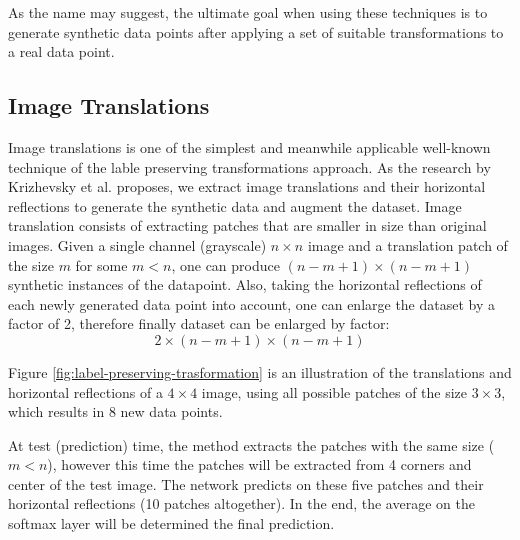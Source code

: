As the name may suggest, the ultimate goal when using these techniques is to generate synthetic data points after applying a set of suitable transformations to a real data point.

\subsection{Image Translations}
Image translations is one of the simplest and meanwhile applicable well-known technique of the lable
preserving transformations approach. As the research by Krizhevsky et al.
\cite{image_translation_paper} proposes, we extract
image translations and their horizontal reflections to generate the synthetic data and augment the
dataset. Image translation consists of extracting patches that are smaller in size than original
images. Given a single channel (grayscale) $n \times n$ image and a translation patch of the size
$m$ for some $m<n$, one can produce $(n-m+1) \times (n-m+1) $ synthetic instances of the datapoint. Also, taking
the horizontal reflections of each newly generated data point into account, one can enlarge the
dataset by a factor of 2, therefore finally dataset can be enlarged by factor: $$2\times(n-m+1)\times(n-m+1)$$ 

Figure \ref{fig:label-preserving-trasformation} is an illustration of the translations and horizontal
reflections of a $4 \times 4$ image, using all
possible patches of the size $3 \times 3$, which results in $8$ new data points.

At test (prediction) time, the method extracts the patches with the same size ($m < n$), however this time the
patches will be extracted from 4 corners and center of the test image. The network predicts on these
five patches and their horizontal reflections (10 patches altogether). In the end, the average
on the softmax layer will be determined the final prediction.

